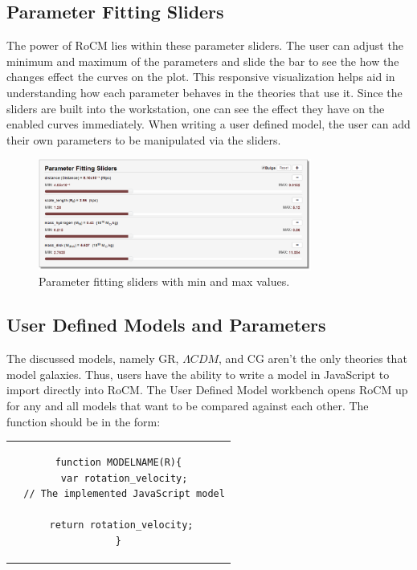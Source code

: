 \documentclass[conference]{IEEEtran-modified}
\begin{document}
\subsection{Parameter Fitting Sliders}

The power of RoCM lies within these parameter sliders. The user can adjust the minimum and maximum of the parameters and slide the bar to see the how the changes effect the curves on the plot. This responsive visualization helps aid in understanding how each parameter behaves in the theories that use it.  Since the sliders are built into the workstation, one can see the effect they have on the enabled curves immediately. When writing a user defined model, the user can add their own parameters to be manipulated via the sliders. 

\begin{figure}[h!]
\centering
\includegraphics[width=0.8\textwidth]{paramslider_long}
\caption{Parameter fitting sliders with min and max values.}
\label{slider_fig}
\end{figure}

\newpage

\subsection{User Defined Models and Parameters}
The discussed models, namely GR, $\Lambda CDM$, and CG aren't the only theories that model galaxies. Thus, users have the ability to write a model in JavaScript to import directly into RoCM. The User Defined Model workbench opens RoCM up for any and all models that want to be compared against each other. The function should be in the form:
\begin{center}
\begin{tabular}{c}
\begin{lstlisting}
function MODELNAME(R){
  var rotation_velocity;
  // The implemented JavaScript model
	
  return rotation_velocity; 
}
\end{lstlisting}
\end{tabular}
\end{center}
\end{document}
